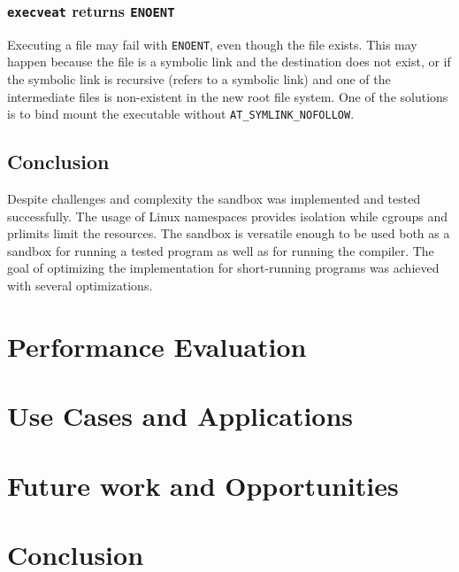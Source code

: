 \documentclass[en]{pracamgr}
\begin{document}
\subsection{\texttt{execveat} returns \texttt{ENOENT}} \label{execveat_returns_enoent}

Executing a file may fail with \texttt{ENOENT}, even though the file exists. This may happen because the file is a symbolic link and the destination does not exist, or if the symbolic link is recursive (refers to a symbolic link) and one of the intermediate files is non-existent in the new root file system. One of the solutions is to bind mount the executable without \texttt{AT\_SYMLINK\_NOFOLLOW}.

\section{Conclusion}

Despite challenges and complexity the sandbox was implemented and tested successfully. The usage of Linux namespaces provides isolation while cgroups and prlimits limit the resources. The sandbox is versatile enough to be used both as a sandbox for running a tested program as well as for running the compiler. The goal of optimizing the implementation for short-running programs was achieved with several optimizations.

\chapter{Performance Evaluation}\label{chapter:performance}

\chapter{Use Cases and Applications}\label{chapter:use_cases}

\chapter{Future work and Opportunities}\label{chapter:future_work}



\chapter{Conclusion}\label{chapter:conclusion}
\end{document}
